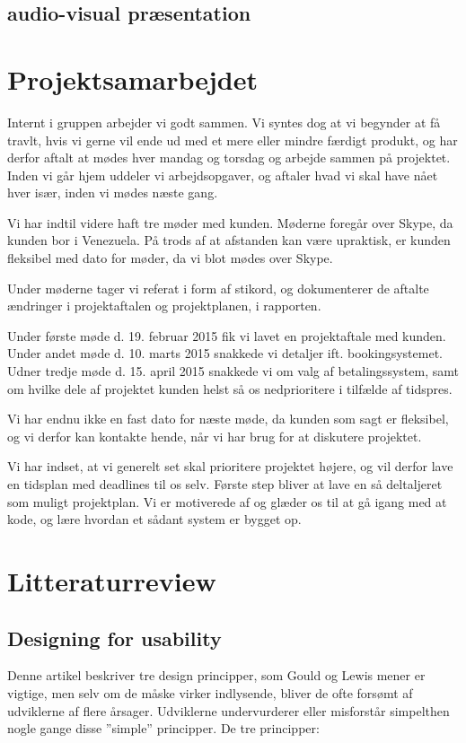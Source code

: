 \documentclass[12pt,a4paper]{article}
\begin{document}
\subsection{audio-visual præsentation}


\section{Projektsamarbejdet}
Internt i gruppen arbejder vi godt sammen. Vi syntes dog at vi begynder at få travlt, hvis vi gerne vil ende ud med et mere eller mindre færdigt produkt, og har derfor aftalt at mødes hver mandag og torsdag og arbejde sammen på projektet. Inden vi går hjem uddeler vi arbejdsopgaver, og aftaler hvad vi skal have nået hver især, inden vi mødes næste gang. 

Vi har indtil videre haft tre møder med kunden. Møderne foregår over Skype, da kunden bor i Venezuela. På trods af at afstanden kan være upraktisk, er kunden fleksibel med dato for møder, da vi blot mødes over Skype.

Under møderne tager vi referat i form af stikord, og dokumenterer de aftalte ændringer i projektaftalen og projektplanen, i rapporten. 

Under første møde d. 19. februar 2015 fik vi lavet en projektaftale med kunden.
Under andet møde d. 10. marts 2015 snakkede vi detaljer ift. bookingsystemet.
Udner tredje møde d. 15. april 2015 snakkede vi om valg af betalingssystem, samt om hvilke dele af projektet kunden helst så os nedprioritere i tilfælde af tidspres.

Vi har endnu ikke en fast dato for næste møde, da kunden som sagt er fleksibel, og vi derfor kan kontakte hende, når vi har brug for at diskutere projektet.

Vi har indset, at vi generelt set skal prioritere projektet højere, og vil derfor lave en tidsplan med deadlines til os selv. Første step bliver at lave en så deltaljeret som muligt projektplan.
Vi er motiverede af og glæder os til at gå igang med at kode, og lære hvordan et sådant system er bygget op. 
\newpage
\section{Litteraturreview}
\subsection{Designing for usability}
Denne artikel beskriver tre design principper, som Gould og Lewis mener er vigtige, men selv om de måske virker indlysende, bliver de ofte forsømt af udviklerne af flere årsager. Udviklerne undervurderer eller misforstår simpelthen nogle gange disse ”simple” principper. De tre principper: 
\end{document}
